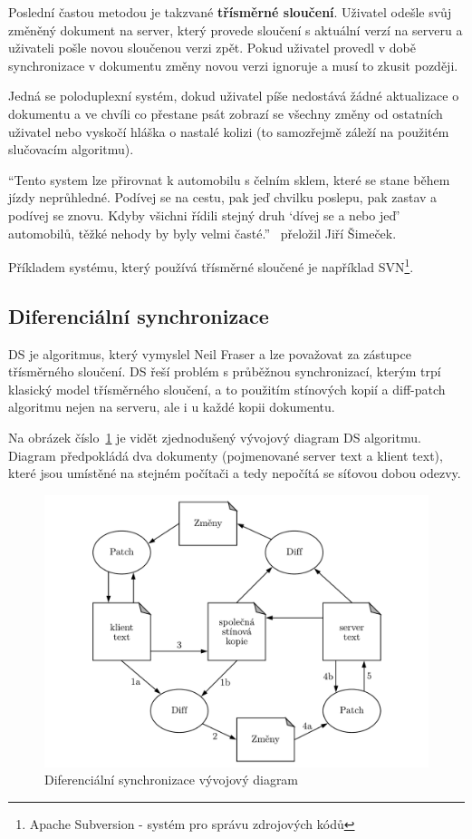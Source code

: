 Poslední častou metodou je takzvané \textbf{třísměrné sloučení}.
Uživatel odešle svůj změněný dokument na server, který provede sloučení s aktuální verzí na serveru a uživateli pošle novou sloučenou verzi zpět.
Pokud uživatel provedl v době synchronizace v dokumentu změny novou verzi ignoruje a musí to zkusit později.

Jedná se poloduplexní systém, dokud uživatel píše nedostává žádné aktualizace o dokumentu a ve chvíli co přestane psát zobrazí se všechny změny od ostatních uživatel nebo vyskočí hláška o nastalé kolizi (to samozřejmě záleží na použitém slučovacím algoritmu).~\cite{ds:neil_paper, ds:neil_video}

\enquote{Tento system lze přirovnat k automobilu s čelním sklem, které se stane během jízdy neprůhledné.
Podívej se na cestu, pak jeď chvilku poslepu, pak zastav a podívej se znovu.
Kdyby všichni řídili stejný druh \enquote{dívej se a nebo jeď} automobilů, těžké nehody by byly velmi časté.}~\cite{ds:neil_paper} přeložil Jiří Šimeček.

Příkladem systému, který používá třísměrné sloučené je například SVN\footnote{Apache Subversion - systém pro správu zdrojových kódů}.

\subsection{Diferenciální synchronizace}\label{subsec:diferencialniSynchronizace}

\gls{DS} je algoritmus, který vymyslel Neil Fraser a lze považovat za zástupce třísměrného sloučení.
\gls{DS} řeší problém s průběžnou synchronizací, kterým trpí klasický model třísměrného sloučení, a to použitím stínových kopií a diff-patch algoritmu nejen na serveru, ale i u každé kopii dokumentu.

Na obrázek číslo~\ref{fig:DS_diagram} je vidět zjednodušený vývojový diagram \gls{DS} algoritmu.
Diagram předpokládá dva dokumenty (pojmenované server text a klient text), které jsou umístěné na stejném počítači a tedy nepočítá se síťovou dobou odezvy.

\begin{figure}[ht]
    \centering
    \includegraphics[width=\textwidth]{partials/analyza/DS_diagram.pdf}
    \caption{Diferenciální synchronizace vývojový diagram~\cite{ds:neil_paper}}\label{fig:DS_diagram}
\end{figure}

